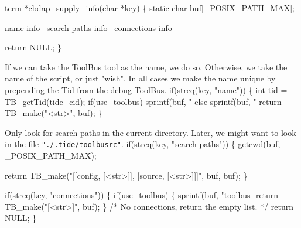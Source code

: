 \nwenddocs{}\endmoddef\let\nwnotused=\nwoutput{}
term *cbdap_supply_info(char *key)
\{
  static char buf[_POSIX_PATH_MAX];

  \LA{}name info~{\nwtagstyle{}}\RA{}
  \LA{}search-paths info~{\nwtagstyle{}}\RA{}
  \LA{}connections info~{\nwtagstyle{}}\RA{}

  return NULL;
\}
\nwendcode{}\nwdocspar

If we can take the ToolBus tool as the name, we do so.
Otherwise, we take the name of the script, or just "wish".
In all cases we make the name unique by prepending the
Tid from the debug ToolBus.
\nwenddocs{}\endmoddef
  if(streq(key, "name")) \{
    int tid = TB_getTid(tide_cid);
    if(use_toolbus)
      sprintf(buf, "%
    else
      sprintf(buf, "%
    return TB_make("<str>", buf);
  \}
\nwendcode{}\nwdocspar

Only look for search paths in the current directory. Later, we
might want to look in the file {\tt "./.tide/toolbusrc"}.
\nwenddocs{}\endmoddef
  if(streq(key, "search-paths")) \{
    getcwd(buf, _POSIX_PATH_MAX);

    return TB_make("[[config, [<str>]], [source, [<str>]]]", buf, buf);
  \}
\nwendcode{}\nwdocspar

\nwenddocs{}\endmoddef
  if(streq(key, "connections")) \{
    if(use_toolbus) \{
      sprintf(buf, "toolbus-%
      return TB_make("[<str>]", buf);
    \}
    /* No connections, return the empty list. */
    return NULL;
  \}
\nwendcode{}\nwdocspar

